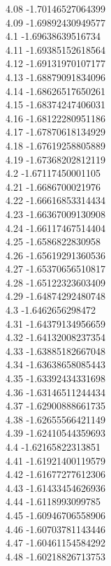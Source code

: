 {4.08	-1.70146527064399\\
4.09	-1.69892430949577\\
4.1	-1.69638639516734\\
4.11	-1.69385152618564\\
4.12	-1.69131970107177\\
4.13	-1.68879091834096\\
4.14	-1.68626517650261\\
4.15	-1.68374247406031\\
4.16	-1.68122280951186\\
4.17	-1.67870618134929\\
4.18	-1.67619258805889\\
4.19	-1.67368202812119\\
4.2	-1.67117450001105\\
4.21	-1.6686700021976\\
4.22	-1.66616853314434\\
4.23	-1.66367009130908\\
4.24	-1.66117467514404\\
4.25	-1.6586822830958\\
4.26	-1.65619291360536\\
4.27	-1.65370656510817\\
4.28	-1.65122323603409\\
4.29	-1.64874292480748\\
4.3	-1.6462656298472\\
4.31	-1.64379134956659\\
4.32	-1.64132008237354\\
4.33	-1.63885182667048\\
4.34	-1.63638658085443\\
4.35	-1.63392434331698\\
4.36	-1.63146511244434\\
4.37	-1.62900888661735\\
4.38	-1.62655566421149\\
4.39	-1.62410544359693\\
4.4	-1.62165822313851\\
4.41	-1.61921400119579\\
4.42	-1.61677277612306\\
4.43	-1.61433454626936\\
4.44	-1.6118993099785\\
4.45	-1.60946706558906\\
4.46	-1.60703781143446\\
4.47	-1.60461154584292\\
4.48	-1.60218826713753\\
}
